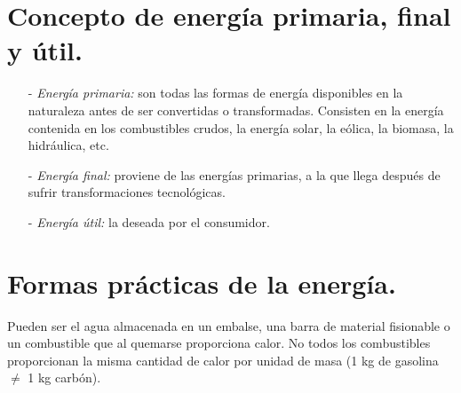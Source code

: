 \section{Concepto de energía primaria, final y útil.}
	\begin{itemize}
		\item[-] \textit{Energía primaria:} 
			son todas las formas de energía disponibles en la naturaleza antes de ser convertidas o transformadas. Consisten en la energía contenida en los combustibles crudos, la energía solar, la eólica, la biomasa, la hidráulica, etc.
		\item[-] \textit{Energía final:}
			proviene de las energías primarias, a la que llega después de sufrir transformaciones tecnológicas.
		\item[-] \textit{Energía útil:}
			la deseada por el consumidor.
	\end{itemize}
	

\section{Formas prácticas de la energía.}
	Pueden ser el agua almacenada en un embalse, una barra de material fisionable o un combustible que al quemarse proporciona calor. No todos los combustibles proporcionan la misma cantidad de calor por unidad de masa (1 kg de gasolina $\neq$ 1 kg carbón).\\
	
